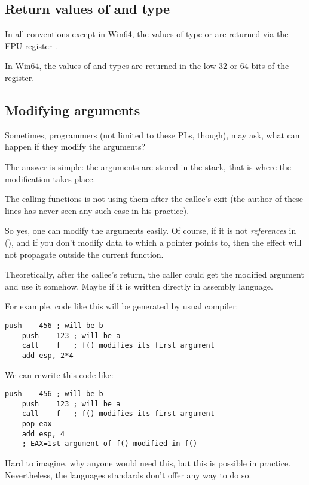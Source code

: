 \subsection{Return values of \Tfloat and \Tdouble type}

In all conventions except in Win64, the values of type \Tfloat or \Tdouble are returned via the FPU register .

In Win64, the values of \Tfloat and \Tdouble types are returned 
in the low 32 or 64 bits of the  register.

\subsection{Modifying arguments}

Sometimes, \CCpp{} programmers (not limited to these \ac{PL}s, though),
may ask, what can happen if they modify the arguments?

The answer is simple: the arguments are stored in the stack, 
that is where the modification takes place.

The calling functions is not using them after the \gls{callee}'s exit (the author of these lines has never seen any such case in his practice).






So yes, one can modify the arguments easily.
Of course, if it is not \emph{references} in \Cpp{} (),
and if you don't modify data to which a pointer points to, 
then the effect will not propagate outside the current function.

Theoretically, after the \gls{callee}'s return, 
the \gls{caller} could get the modified argument and use it somehow.
Maybe if it is written directly in assembly language.

For example, code like this will be generated by usual \CCpp compiler:

\begin{lstlisting}[style=customasmx86]
	push	456	; will be b
	push	123	; will be a
	call	f	; f() modifies its first argument
	add	esp, 2*4
\end{lstlisting}

We can rewrite this code like:

\begin{lstlisting}[style=customasmx86]
	push	456	; will be b
	push	123	; will be a
	call	f	; f() modifies its first argument
	pop	eax
	add	esp, 4
	; EAX=1st argument of f() modified in f()
\end{lstlisting}

Hard to imagine, why anyone would need this, but this is possible in practice.
Nevertheless, the \CCpp languages standards don't offer any way to do so.





